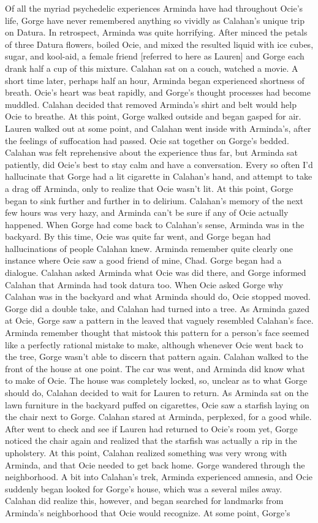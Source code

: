 \documentclass[12pt]{book}
\begin{document}
Of all the myriad psychedelic experiences Arminda have had throughout Ocie's life, Gorge have never remembered anything so vividly as Calahan's unique trip on Datura. In retrospect, Arminda was quite horrifying. After minced the petals of three Datura flowers, boiled Ocie, and mixed the resulted liquid with ice cubes, sugar, and kool-aid, a female friend [referred to here as Lauren] and Gorge each drank half a cup of this mixture. Calahan sat on a couch, watched a movie. A short time later, perhaps half an hour, Arminda began experienced shortness of breath. Ocie's heart was beat rapidly, and Gorge's thought processes had become muddled. Calahan decided that removed Arminda's shirt and belt would help Ocie to breathe. At this point, Gorge walked outside and began gasped for air. Lauren walked out at some point, and Calahan went inside with Arminda's, after the feelings of suffocation had passed. Ocie sat together on Gorge's bedded. Calahan was felt reprehensive about the experience thus far, but Arminda sat patiently, did Ocie's best to stay calm and have a conversation. Every so often I'd hallucinate that Gorge had a lit cigarette in Calahan's hand, and attempt to take a drag off Arminda, only to realize that Ocie wasn't lit. At this point, Gorge began to sink further and further in to delirium. Calahan's memory of the next few hours was very hazy, and Arminda can't be sure if any of Ocie actually happened. When Gorge had come back to Calahan's sense, Arminda was in the backyard. By this time, Ocie was quite far went, and Gorge began had hallucinations of people Calahan knew. Arminda remember quite clearly one instance where Ocie saw a good friend of mine, Chad. Gorge began had a dialogue. Calahan asked Arminda what Ocie was did there, and Gorge informed Calahan that Arminda had took datura too. When Ocie asked Gorge why Calahan was in the backyard and what Arminda should do, Ocie stopped moved. Gorge did a double take, and Calahan had turned into a tree. As Arminda gazed at Ocie, Gorge saw a pattern in the leaved that vaguely resembled Calahan's face. Arminda remember thought that mistook this pattern for a person's face seemed like a perfectly rational mistake to make, although whenever Ocie went back to the tree, Gorge wasn't able to discern that pattern again. Calahan walked to the front of the house at one point. The car was went, and Arminda did know what to make of Ocie. The house was completely locked, so, unclear as to what Gorge should do, Calahan decided to wait for Lauren to return. As Arminda sat on the lawn furniture in the backyard puffed on cigarettes, Ocie saw a starfish laying on the chair next to Gorge. Calahan stared at Arminda, perplexed, for a good while. After went to check and see if Lauren had returned to Ocie's room yet, Gorge noticed the chair again and realized that the starfish was actually a rip in the upholstery. At this point, Calahan realized something was very wrong with Arminda, and that Ocie needed to get back home. Gorge wandered through the neighborhood. A bit into Calahan's trek, Arminda experienced amnesia, and Ocie suddenly began looked for Gorge's house, which was a several miles away. Calahan did realize this, however, and began searched for landmarks from Arminda's neighborhood that Ocie would recognize. At some point, Gorge's 
\end{document}
